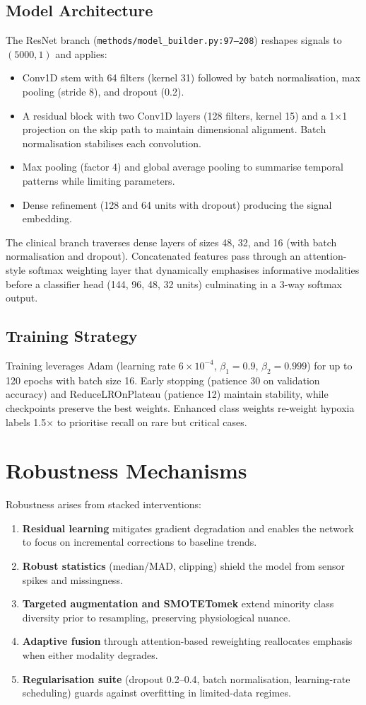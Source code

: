\documentclass[12pt,a4paper]{article}
\begin{document}
\subsection{Model Architecture}
The ResNet branch (\texttt{methods/model\_builder.py:97--208}) reshapes signals to $(5000,1)$ and applies:
\begin{itemize}
    \item Conv1D stem with 64 filters (kernel 31) followed by batch normalisation, max pooling (stride 8), and dropout (0.2).
    \item A residual block with two Conv1D layers (128 filters, kernel 15) and a 1$\times$1 projection on the skip path to maintain dimensional alignment. Batch normalisation stabilises each convolution.
    \item Max pooling (factor 4) and global average pooling to summarise temporal patterns while limiting parameters.
    \item Dense refinement (128 and 64 units with dropout) producing the signal embedding.
\end{itemize}
The clinical branch traverses dense layers of sizes 48, 32, and 16 (with batch normalisation and dropout). Concatenated features pass through an attention-style softmax weighting layer that dynamically emphasises informative modalities before a classifier head (144, 96, 48, 32 units) culminating in a 3-way softmax output.

\subsection{Training Strategy}
Training leverages Adam (learning rate $6\times 10^{-4}$, $\beta_1=0.9$, $\beta_2=0.999$) for up to 120 epochs with batch size 16. Early stopping (patience 30 on validation accuracy) and ReduceLROnPlateau (patience 12) maintain stability, while checkpoints preserve the best weights. Enhanced class weights re-weight hypoxia labels 1.5$\times$ to prioritise recall on rare but critical cases.

\section{Robustness Mechanisms}
Robustness arises from stacked interventions:
\begin{enumerate}
    \item \textbf{Residual learning} mitigates gradient degradation and enables the network to focus on incremental corrections to baseline trends.
    \item \textbf{Robust statistics} (median/MAD, clipping) shield the model from sensor spikes and missingness.
    \item \textbf{Targeted augmentation and SMOTETomek} extend minority class diversity prior to resampling, preserving physiological nuance.
    \item \textbf{Adaptive fusion} through attention-based reweighting reallocates emphasis when either modality degrades.
    \item \textbf{Regularisation suite} (dropout 0.2--0.4, batch normalisation, learning-rate scheduling) guards against overfitting in limited-data regimes.
\end{enumerate}
\end{document}
